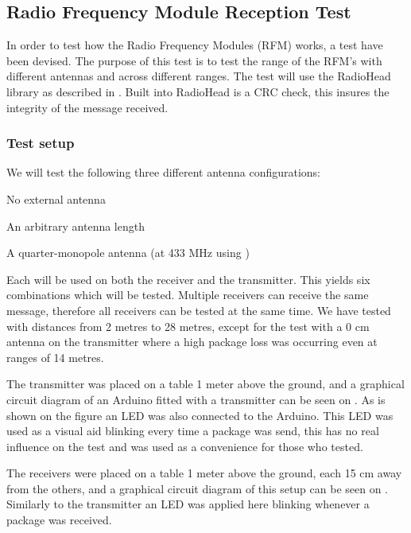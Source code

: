 \subsection{Radio Frequency Module Reception Test} %
\label{cha:radio_frequency_module_reception_test}
In order to test how the Radio Frequency Modules (RFM) works, a test have been devised. 
The purpose of this test is to test the range of the RFM's with different antennas and across different ranges. 
The test will use the RadioHead library as described in . 
Built into RadioHead is a CRC check, this insures the integrity of the message received. 

\subsubsection*{Test setup}
We will test the following three different antenna configurations: 
\begin{description}[labelindent=\parindent, labelwidth=\widthof{\bfseries 17.3 cm}, align=parright]
    \item[0 cm] No external antenna
    \item[12 cm] An arbitrary antenna length
    \item[17.3 cm] A quarter-monopole antenna (at 433 MHz using )  
\end{description}
Each will be used on both the receiver and the transmitter. 
This yields six combinations which will be tested. 
Multiple receivers can receive the same message, therefore all receivers can be tested at the same time. 
We have tested with distances from 2 metres to 28 metres, except for the test with a 0 cm antenna on the transmitter where a high package loss was occurring even at ranges of 14 metres. 

The transmitter was placed on a table 1 meter above the ground, and a graphical circuit diagram of an Arduino fitted with a transmitter can be seen on .
As is shown on the figure an LED was also connected to the Arduino.
This LED was used as a visual aid blinking every time a package was send, this has no real influence on the test and was used as a convenience for those who tested.

The receivers were placed on a table 1 meter above the ground, each 15 cm away from the others, and a graphical circuit diagram of this setup can be seen on .
Similarly to the transmitter an LED was applied here blinking whenever a package was received.

